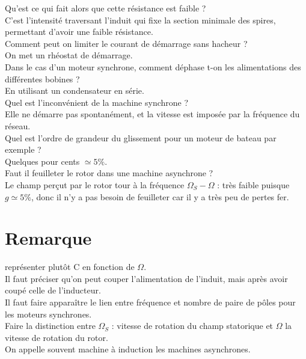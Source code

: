 \documentclass[12pt,prb,aps,epsf]{article}
\begin{document}
Qu'est ce qui fait alors que cette résistance est faible ?\\
C'est l'intensité traversant l'induit qui fixe la section minimale des spires, permettant d'avoir une faible résistance.\\

Comment peut on limiter le courant de démarrage sans hacheur ?\\
On met un rhéostat de démarrage.\\

Dans le cas d'un moteur synchrone, comment déphase t-on les alimentations des différentes bobines ?\\
En utilisant un condensateur en série.\\

Quel est l'inconvénient de la machine synchrone ?\\
Elle ne démarre pas spontanément, et la vitesse est imposée par la fréquence du réseau.\\

Quel est l'ordre de grandeur du glissement pour un moteur de bateau par exemple ?\\
Quelques pour cents $\simeq 5\%$.\\

Faut il feuilleter le rotor dans une machine asynchrone ?\\
Le champ perçut par le rotor tour à la fréquence $\Omega_S-\Omega$ : très faible puisque $g\simeq 5\%$, donc il n'y a pas besoin de feuilleter car il y a très peu de pertes fer.

\section*{Remarque}
représenter plutôt C en fonction de $\Omega$.\\
Il faut préciser qu'on peut couper l'alimentation de l'induit, mais après avoir coupé celle de l'inducteur.\\

Il faut faire apparaître le lien entre fréquence et nombre de paire de pôles pour les moteurs synchrones.\\

Faire la distinction entre $\Omega_S$ : vitesse de rotation du champ statorique et $\Omega$ la vitesse de rotation du rotor.\\

On appelle souvent machine à induction les machines asynchrones.\\
\end{document}
